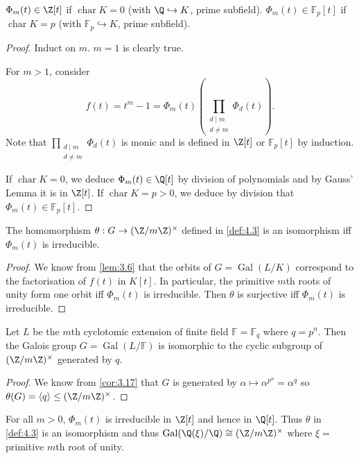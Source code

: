 \documentclass{article}
\DeclareMathOperator{\chara}{char}
\DeclareMathOperator{\Gal}{Gal}
\newcommand{\F}{\mathbb{F}}
\begin{document}
\begin{nlemma}\label{lem:4.5}
    $\Phi_m(t) \in \Z[t]$ if $\chara K = 0$ (with $\Q \hookrightarrow K$, prime subfield).
    $\Phi_m(t) \in \F_p[t]$ if $\chara K = p$ (with $\F_p \hookrightarrow K$, prime subfield).
\end{nlemma}
\begin{proof}
    Induct on $m$. $m=1$ is clearly true.

    For $m>1$, consider
    \begin{equation*}
        f(t) = t^m - 1 = \Phi_m(t) \left(\prod_{\substack{d \mid m \\ d \neq m}} \Phi_d(t)\right).
    \end{equation*}
    Note that $\prod_{\substack{d \mid m \\ d \neq m}} \Phi_d(t)$ is monic and is defined in $\Z[t]$ or $\F_p[t]$ by induction.

    If $\chara K = 0$, we deduce $\Phi_m(t) \in \Q[t]$ by division of polynomials and by Gauss' Lemma it is in $\Z[t]$.
    If $\chara K = p > 0$, we deduce by division that $\Phi_m(t) \in \F_p[t]$.
\end{proof}
\begin{nlemma}\label{lem:4.6}
    The homomorphism $\theta: G \to (\Z/m\Z)^\times$ defined in \cref{def:4.3} is an isomorphism iff $\Phi_m(t)$ is irreducible.
\end{nlemma}
\begin{proof}
    We know from \cref{lem:3.6} that the orbits of $G = \Gal(L/K)$ correspond to the factorisation of $f(t)$ in $K[t]$.
    In particular, the primitive $m$th roots of unity form one orbit iff $\Phi_m(t)$ is irreducible.
    Then $\theta$ is surjective iff $\Phi_m(t)$ is irreducible.
\end{proof}
\begin{nthm}\label{thm:4.7}
    Let $L$ be the $m$th cyclotomic extension of finite field $\F = \F_q$ where $q = p^n$.
    Then the Galois group $G = \Gal(L/\F)$ is isomorphic to the cyclic subgroup of $(\Z/m\Z)^\times$ generated by $q$.
\end{nthm}
\begin{proof}
    We know from \cref{cor:3.17} that $G$ is generated by $\alpha \mapsto \alpha^{p^n} = \alpha^q$ so $\theta(G) = \langle q\rangle \leq (\Z/m\Z)^\times$.
\end{proof}



\begin{nthm}\label{thm:4.8}
    For all $m > 0$, $\Phi_m(t)$ is irreducible in $\Z[t]$ and hence in $\Q[t]$.
    Thus $\theta$ in \cref{def:4.3} is an isomorphism and thus $\Gal(\Q(\xi)/\Q) \cong (\Z/m\Z)^\times$ where $\xi =$ primitive $m$th root of unity.
\end{nthm}
\end{document}
